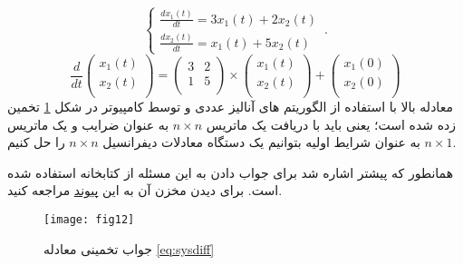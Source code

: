 \begin{equation}\label{eq:sysdiff}
	\begin{cases}
		\frac{dx_1(t)}{dt}=3x_1(t) + 2x_2(t) \\
		\frac{dx_2(t)}{dt}=x_1(t) + 5x_2(t)
	\end{cases}\,.
\end{equation}
\begin{equation}
	\label{eq:mxdiff}
	\frac{d}{dt}
	\begin{pmatrix}
		x_1(t)\\
		x_2(t)\\
	\end{pmatrix}
	=
	\begin{pmatrix}
		3 & 2\\
	    1 & 5\\
	\end{pmatrix}
  \times
  \begin{pmatrix}
  	x_1(t)\\
  	x_2(t)\\
  \end{pmatrix}
+
\begin{pmatrix}
	x_1(0)\\
	x_2(0)\\
\end{pmatrix}
\end{equation}
معادله بالا با استفاده از الگوریتم های آنالیز عددی و توسط کامپیوتر در شکل 
\ref{fig:fig12}
تخمین زده شده است؛
یعنی باید با دریافت یک ماتریس 
 $n \times n$
به عنوان ضرایب و یک ماتریس
 $n \times 1$
به عنوان شرایط اولیه
بتوانیم یک دستگاه معادلات دیفرانسیل 
 $n \times n$
 را حل کنیم.

همانطور که پیشتر اشاره شد برای جواب دادن به این مسئله از کتابخانه
استفاده شده است. برای دیدن مخزن آن به این
\href{https://github.com/Mehrdadghassabi/odeintw}{پیوند}
 مراجعه کنید.

\begin{figure}[ht]
	\centerline{\texttt{[image: fig12]}}
	\caption{جواب تخمینی معادله 
		\ref{eq:sysdiff}	
	}
	\label{fig:fig12}
\end{figure}